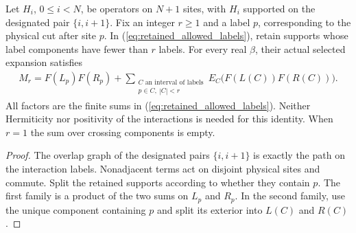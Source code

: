 \begin{lemma}
    \label{thm:physical_cluster_crossing_decomposition}
    \leanok

    Let $H_i$, $0\leq i<N$, be operators on $N+1$ sites, with
    $H_i$ supported on the designated pair $\{i,i+1\}$. Fix an integer
    $r\geq1$ and a label $p$, corresponding to the physical cut after
    site $p$. In (\ref{eq:retained_allowed_labels}), retain supports
    whose label components have fewer than $r$ labels. For every real
    $\beta$, their actual selected expansion satisfies
    \begin{align}
        M_r=F(L_p)F(R_p)+
          \sum_{\substack{C\text{ an interval of labels}\\p\in C,\ |C|<r}}
            E_C\bigl(F(L(C))F(R(C))\bigr).
        \label{eq:physical_cluster_crossing_decomposition}
    \end{align}
    All factors are the finite sums in
    (\ref{eq:retained_allowed_labels}). Neither Hermiticity nor
    positivity of the interactions is needed for this identity.
    When $r=1$ the sum over crossing components is empty.
\end{lemma}
\begin{proof}\leanok
    The overlap graph of the designated pairs $\{i,i+1\}$ is exactly
    the path on the interaction labels. Nonadjacent terms act on
    disjoint physical sites and commute. Split the retained supports
    according to whether they contain $p$. The first family is a
    product of the two sums on $L_p$ and $R_p$. In the second family,
    use the unique component containing $p$ and split its exterior
    into $L(C)$ and $R(C)$.
\end{proof}

